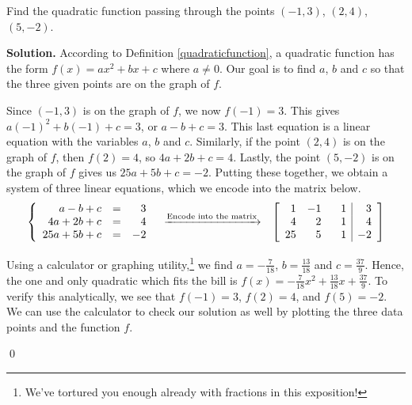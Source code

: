 \documentclass{ximera}
\begin{document}
\begin{example}  \label{matrixcurvefitting} Find the quadratic function passing through the points $(-1,3)$, $(2,4)$, $(5,-2)$.

\smallskip

{\bf Solution.} According to Definition \ref{quadraticfunction}, a quadratic function has the form $f(x) =ax^2+bx+c$ where $a \neq 0$.   Our goal is to find $a$, $b$ and $c$ so that the three given points are on the graph of $f$.   

Since $(-1,3)$ is on the graph of $f$, we now $f(-1) = 3$.  This gives  $a(-1)^2+b(-1) + c = 3$, or  $a-b+c=3$. This last equation is a linear equation with the variables $a$, $b$ and $c$.  Similarly, if the point  $(2,4)$ is on the graph of $f$, then $f(2) = 4$, so  $4a+2b+c = 4$.  Lastly, the point $(5,-2)$ is on the graph of $f$ gives us $25a+5b+c = -2$.  Putting these together, we obtain a system of three linear equations, which we encode into the matrix below.  
\[ \begin{array}{ccc}

\left\{ \begin{array}{rcr} 
a-b+c & = & 3 \\ 
4a+2b+c & = & 4 \\ 
25a+5b+c & = & -2  \end{array} \right.

&

\xrightarrow{\text{Encode into the matrix}}

&

 \left[ \begin{array}{rrr|r}
1 & -1 & \hphantom{-}1 & 3 \\
 4 & 2 & 1 & 4 \\
 25 & 5 & 1 & -2 \\ \end{array} \right]

 \end{array}\]

Using a calculator or graphing utility,\footnote{We've tortured you enough already with fractions in this exposition!} we find $a = -\frac{7}{18}$, $b = \frac{13}{18}$ and $c = \frac{37}{9}$.  Hence, the one and only quadratic which fits the bill is $f(x) = -\frac{7}{18} x^2 + \frac{13}{18} x + \frac{37}{9}$.  To verify this analytically, we see that $f(-1) = 3$, $f(2) = 4$, and $f(5) = -2$.  We can use the calculator to check our solution as well by plotting the three data points and the function $f$.

\begin{center}
\end{center}

\qed

\end{example}



\closegraphsfile
\end{document}

